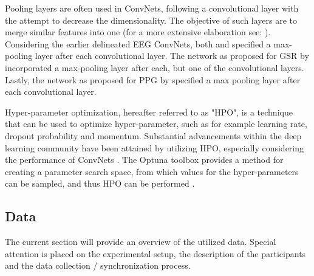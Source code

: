 \documentclass[12pt]{article}
\begin{document}
Pooling layers are often used in ConvNets, following a convolutional layer with the attempt to decrease the dimensionality. The objective of such layers are to merge similar features into one (for a more extensive elaboration see: ). Considering the earlier delineated EEG ConvNets, both  and  specified a max-pooling layer after each convolutional layer. The network as proposed for GSR by  incorporated a max-pooling layer after each, but one of the convolutional layers. Lastly, the network as proposed for PPG by \cite{biswas2019cornet}  specified a max pooling layer after each convolutional layer. 

Hyper-parameter optimization, hereafter referred to as "HPO", is a technique that can be used to optimize hyper-parameter, such as for example learning rate, dropout probability and momentum. Substantial advancements within the deep learning community have been attained by utilizing HPO, especially considering the performance of ConvNets \cite{bergstra2012random}. The Optuna toolbox provides a method for creating a parameter search space, from which values for the hyper-parameters can be sampled, and thus HPO can be performed \cite{akiba2019optuna}. 

\subsection{Data}
The current section will provide an overview of the utilized data. Special attention is placed on the experimental setup, the description of the participants and the data collection / synchronization process. 
\end{document}
